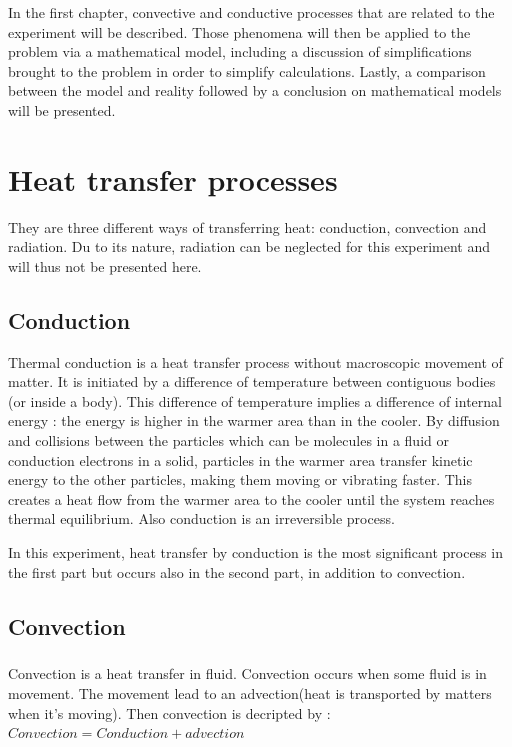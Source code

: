 \documentclass{report}
\begin{document}
	In the first chapter, convective and conductive processes that are related to the experiment will be described. Those phenomena will then be applied to the problem via a mathematical model, including a discussion of simplifications brought to the problem in order to simplify calculations. Lastly, a comparison between the model and reality followed by a conclusion on mathematical models will be presented.
	
	\chapter{Heat transfer processes}\label{htp}
	
	They are three different ways of transferring heat: conduction, convection and radiation. Du to its nature, radiation can be neglected for this experiment and will thus not be presented here.
	
	\section{Conduction}\label{cd}
	
	Thermal conduction is a heat transfer process without macroscopic movement of matter. It is initiated by a difference of temperature between contiguous bodies (or inside a body). This difference of temperature implies a difference of internal energy : the energy is higher in the warmer area than in the cooler. By diffusion and collisions between the particles which can be molecules in a fluid or conduction electrons in a solid, particles in the warmer area transfer kinetic energy to the other particles, making them moving or vibrating faster. This creates a heat flow from the warmer area to the cooler until the system reaches thermal equilibrium. Also conduction is an irreversible process.
	
	In this experiment, heat transfer by conduction is the most significant process in the first part but occurs also in the second part, in addition to convection.
	
	\section{Convection}\label{cv}
	
	\paragraph{}Convection is a heat transfer in fluid. Convection occurs when some fluid is in movement. The movement lead to an advection(heat is transported by matters when it's moving). Then convection is decripted by :\\
	$Convection = Conduction + advection$
	
\end{document}
